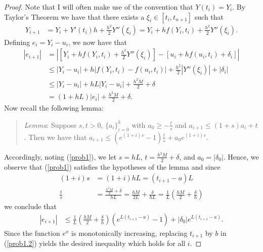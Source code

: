 \documentclass[8pt]{article}
\theoremstyle{definition}
\begin{document}
\begin{proof}
Note that I will often make use of the convention that $Y(t_i) = Y_i$. By Taylor's Theorem we have that there exists a $\xi_i \in [t_i, t_{n+1}]$ such that  
\begin{align*}
Y_{i+1} &= Y_i + Y'(t_i) h + \frac{h^2}{2} Y'' (\xi_i) = Y_i + h f(Y_i, t_i) + \frac{h^2}{2} Y'' (\xi_i).
\end{align*}
Defining $e_i = Y_i - u_i$, we now have that 
\begin{align}
|e_{i+1}| &= \left| \left[Y_i + h f(Y_i, t_i) + \frac{h^2}{2} Y'' (\xi_i) \right] - \left[ u_i + h f(u_i, t_i) + \delta_i \right] \right| \nonumber \\
&\leq \left|Y_i  - u_i \right| + h \left| f(Y_i, t_i)  - f(u_i, t_i) \right|+ \frac{h^2}{2} \left|Y'' (\xi_i) \right| + \left| \delta_i \right| \nonumber \\
&\leq \left| Y_i - u_i \right| + h L \left| Y_i - u_i \right|+ \frac{h^2 M}{2} + \delta \tag{Since $f$ is Lipschitz in y} \\
&= (1 + hL) \left| e_i \right| + \frac{h^2 M}{2} + \delta. \label{prob1}
\end{align}
Now recall the following lemma:
\begin{quote}
\emph{Lemma}: Suppose $s, t > 0$, $\{ a_i \}_{i = 0}^{k}$ with $a_0 \geq - \frac{t}{s}$ and $a_{i + 1} \leq (1 + s) a_i + t$. Then we have that $a_{i+1} \leq \left( e^{(1 + i)s} - 1 \right) \frac{t}{s} + a_0 e^{(1 + i)s}$.
\end{quote}
Accordingly, noting (\ref{prob1}), we let $s = hL$, $t = \frac{h^2 M}{2} + \delta$, and $a_0 = |\delta_0|$. Hence, we observe that (\ref{prob1}) satisfies the hypotheses of the lemma and since
\begin{align*}
(1+i)s &= (1+i)hL = (t_{i+1} - a)L \\
\frac{t}{s} &= \frac{\frac{h^2 M}{2} + \delta}{hL} = \frac{hM}{2L} + \frac{\delta}{hL} = \frac{1}{L} \left( \frac{hM}{2} + \frac{\delta}{h} \right)
\end{align*}
we conclude that 
\begin{align}
|e_{i+1}| &\leq \frac{1}{L} \left( \frac{hM}{2} + \frac{\delta}{h} \right) \left( e^{L(t_{i+1}-a)} - 1 \right) + | \delta_0| e^{L(t_{i+1}-a)}. \label{prob1.2}
\end{align}
Since the function $e^x$ is monotonically increasing, replacing $t_{i+1}$ by $b$ in (\ref{prob1.2}) yields the desired inequality which holds for all $i$.
\end{proof}
\end{document}
